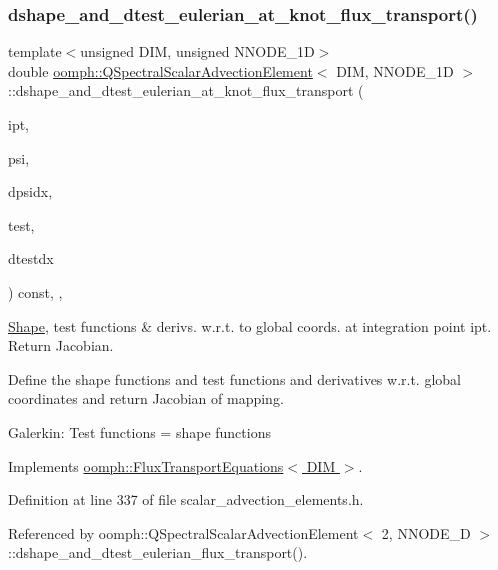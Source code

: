\subsubsection{\texorpdfstring{dshape\+\_\+and\+\_\+dtest\+\_\+eulerian\+\_\+at\+\_\+knot\+\_\+flux\+\_\+transport()}{dshape\_and\_dtest\_eulerian\_at\_knot\_flux\_transport()}}
{\footnotesize\ttfamily template$<$unsigned D\+IM, unsigned N\+N\+O\+D\+E\+\_\+1D$>$ \\
double \hyperlink{classoomph_1_1QSpectralScalarAdvectionElement}{oomph\+::\+Q\+Spectral\+Scalar\+Advection\+Element}$<$ D\+IM, N\+N\+O\+D\+E\+\_\+1D $>$\+::dshape\+\_\+and\+\_\+dtest\+\_\+eulerian\+\_\+at\+\_\+knot\+\_\+flux\+\_\+transport (\begin{DoxyParamCaption}\item[{const unsigned \&}]{ipt,  }\item[{\hyperlink{classoomph_1_1Shape}{Shape} \&}]{psi,  }\item[{\hyperlink{classoomph_1_1DShape}{D\+Shape} \&}]{dpsidx,  }\item[{\hyperlink{classoomph_1_1Shape}{Shape} \&}]{test,  }\item[{\hyperlink{classoomph_1_1DShape}{D\+Shape} \&}]{dtestdx }\end{DoxyParamCaption}) const\hspace{0.3cm}{\ttfamily [inline]}, {\ttfamily [protected]}, {\ttfamily [virtual]}}



\hyperlink{classoomph_1_1Shape}{Shape}, test functions \& derivs. w.\+r.\+t. to global coords. at integration point ipt. Return Jacobian. 

Define the shape functions and test functions and derivatives w.\+r.\+t. global coordinates and return Jacobian of mapping.

Galerkin\+: Test functions = shape functions 

Implements \hyperlink{classoomph_1_1FluxTransportEquations_a21e7b05ac839ce2db818356ee6906e1c}{oomph\+::\+Flux\+Transport\+Equations$<$ D\+I\+M $>$}.



Definition at line 337 of file scalar\+\_\+advection\+\_\+elements.\+h.



Referenced by oomph\+::\+Q\+Spectral\+Scalar\+Advection\+Element$<$ 2, N\+N\+O\+D\+E\+\_\+D $>$\+::dshape\+\_\+and\+\_\+dtest\+\_\+eulerian\+\_\+flux\+\_\+transport().

\mbox{\label{classoomph_1_1QSpectralScalarAdvectionElement_a6cc8f352ebe569b0251345aa6e312729}} 
